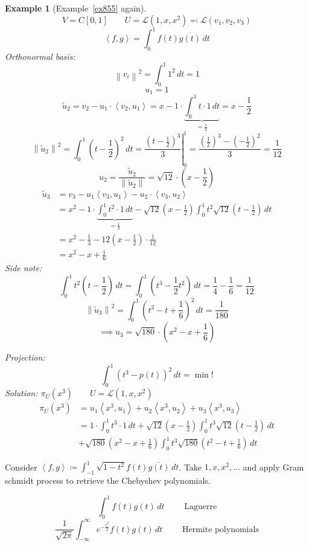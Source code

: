 \documentclass{article}
\newtheorem{example}{Example}  \numberwithin{example}{section}
\newcommand{\ip}[2]{\left\langle#1,#2\right\rangle} %
\newcommand{\norm}[1]{\left\|#1\right\|}
\begin{document}
\begin{example}[Example~\ref{ex855} again] %
  \[ V = C[0,1] \qquad U = \mathcal L(1, x, x^2) \eqqcolon \mathcal L(v_1, v_2, v_3) \]
  \[ \ip fg = \int_0^1 f(t) \overline{g(t)} \, dt \]
  Orthonormal basis:
  \[ \norm{v_i}^2 = \int_0^1 1^2 \, dt = 1 \]
  \[ u_1 = 1 \]
  \[ \tilde u_2 = v_2 - u_1 \cdot \ip{v_2}{u_1} = x - 1 \cdot \underbrace{\int_0^1 t \cdot 1 \, dt}_{= \frac12} = x - \frac12 \]
  \[ \norm{\tilde u_2}^2 = \int_0^1 (t - \frac12)^2 \, dt = \left.\frac{(t - \frac12)^3}{3} \right|_0^1 = \frac{(\frac12)^3 - (-\frac12)^2}{3} = \frac1{12} \]
  \[ u_2 = \frac{\tilde u_2}{\norm{\tilde u_2}} = \sqrt{12} \cdot (x - \frac12) \]
  \begin{align*}
    \tilde u_3 &= v_3 - u_1 \ip{v_3}{u_1} - u_2 \cdot \ip{v_3}{u_2} \\
      &= x^2 - 1 \cdot \underbrace{\int_0^1 t^2 \cdot 1 \, dt}_{= \frac13} - \sqrt{12} (x - \frac12) \int_0^1 t^2 \sqrt{12} (t - \frac12) \, dt \\
      &= x^2 - \frac13 - 12 (x - \frac12) \cdot \frac1{12} \\
      &= x^2 - x + \frac16
  \end{align*}
  Side note:
  \[ \int_0^1 t^2 (t - \frac12) \, dt = \int_0^1 (t^3 - \frac12 t^2) \, dt = \frac14 - \frac16 = \frac1{12} \]
  \[ \norm{\tilde u_3}^2 = \int_0^1 (t^2 - t + \frac16)^2 \, dt = \frac1{180} \]
  \[ \implies u_3 = \sqrt{180} \cdot (x^2 - x + \frac16) \]

  Projection:
  \[ \int_0^1 (t^3 - p(t))^2 \, dt = \operatorname{min}! \]
  Solution: $\pi_U(x^3) \qquad U = \mathcal L(1, x, x^2)$
  \begin{align*}
    \pi_U(x^3) &= u_1 \ip{x^3}{u_1} + u_2 \ip{x^3}{u_2} + u_3 \ip{x^3}{u_3} \\
      &= 1 \cdot \int_0^1  t^3 \cdot 1 \, dt + \sqrt{12} (x - \frac12) \int_0^1 t^3 \sqrt{12} (t - \frac12) \, dt \\
      &+ \sqrt{180} (x^2 - x + \frac16) \int_0^1 t^3 \sqrt{180} (t^2 - t + \frac16) \, dt
  \end{align*}
\end{example}

Consider $\ip fg \coloneqq \int_{-1}^1 \sqrt{1 - t^2} f(t) \overline{g(t)} \, dt$.
Take $1, x, x^2, \ldots$ and apply Gram schmidt process to retrieve the Chebyshev polynomials.

\[ \int_0^1 f(t) g(t) \, dt \qquad \text{ Laguerre} \]
\[ \frac1{\sqrt{2\pi}} \int_{-\infty}^\infty e^{-\frac{t^2}{2}}  f(t) g(t) \, dt \qquad \text{ Hermite polynomials} \]
\end{document}
